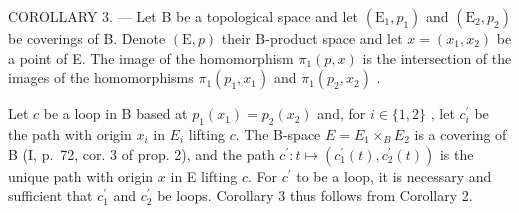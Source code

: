 COROLLARY 3. --- Let B be a topological space and let \((\mathrm{E}_{1}, p_{1})\) and \((\mathrm{E}_{2}, p_{2})\) be coverings of B. Denote \((\mathrm{E}, p)\) their B-product space and let \(x = (x_{1}, x_{2})\) be a point of E. The image of the homomorphism \(\pi_{1}(p, x)\) is the intersection of the images of the homomorphisms \(\pi_{1}(p_{1}, x_{1})\) and \(\pi_{1}(p_{2}, x_{2})\) .

Let \(c\) be a loop in B based at \(p_{1}(x_{1}) = p_{2}(x_{2})\) and, for \(i \in \{1, 2\}\) , let \(c_{i}^{\prime}\) be the path with origin \(x_i\) in \(E_i\) lifting \(c\). The B-space \(E = E_{1} \times_{B} E_{2}\) is a covering of B (I, p.~72, cor. 3 of prop. 2), and the path \(c^{\prime}: t \mapsto (c_{1}^{\prime}(t), c_{2}^{\prime}(t))\) is the unique path with origin \(x\) in E lifting \(c\). For \(c^{\prime}\) to be a loop, it is necessary and sufficient that \(c_{1}^{\prime}\) and \(c_{2}^{\prime}\) be loops. Corollary 3 thus follows from Corollary 2.

